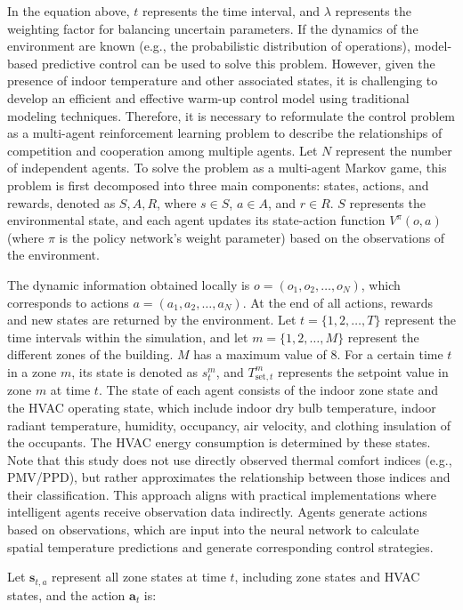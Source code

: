 \documentclass[preprint,12pt]{elsarticle}
\begin{document}
In the equation above, $t$ represents the time interval, and $\lambda$ represents the 
weighting factor for balancing uncertain parameters. If the dynamics of the environment are 
known (e.g., the probabilistic distribution of operations), model-based predictive control can be 
used to solve this problem. However, given the presence of indoor temperature and other associated states, 
it is challenging to develop an efficient and effective warm-up control model using traditional modeling techniques. 
Therefore, it is necessary to reformulate the control problem as a multi-agent reinforcement learning problem 
to describe the relationships of competition and cooperation among multiple agents. Let $N$ represent the 
number of independent agents. To solve the problem as a multi-agent Markov game, this problem is first decomposed 
into three main components: states, actions, and rewards, denoted as $S, A, R$, where $s \in S$, $a \in A$, 
and $r \in R$. $S$ represents the environmental state, and each agent updates its 
state-action function $V^\pi(o, a)$ (where $\pi$ is the policy network’s weight parameter) based 
on the observations of the environment.

The dynamic information obtained locally is $o = (o_1, o_2, \ldots, o_N)$, which corresponds to 
actions $a = (a_1, a_2, \ldots, a_N)$. At the end of all actions, rewards and new states are returned by the environment.
Let $t = \{1, 2, \ldots, T\}$ represent the time intervals within the simulation, 
and let $m = \{1, 2, \ldots, M\}$ represent the different zones of the building. $M$ has a 
maximum value of 8. For a certain time $t$ in a zone $m$, its state is denoted as $s_t^m$, 
and $T_{\text{set},t}^m$ represents the setpoint value in zone $m$ at time $t$. The state of 
each agent consists of the indoor zone state and the HVAC operating state, which include indoor dry bulb temperature, 
indoor radiant temperature, humidity, occupancy, air velocity, and clothing insulation of the occupants. 
The HVAC energy consumption is determined by these states. Note that this study does not use directly 
observed thermal comfort indices (e.g., PMV/PPD), but rather approximates the relationship between those 
indices and their classification. This approach aligns with practical implementations where intelligent agents 
receive observation data indirectly. Agents generate actions based on observations, which are input into the 
neural network to calculate spatial temperature predictions and generate corresponding control strategies.

Let $\mathbf{s}_{t,a}$ represent all zone states at time $t$, including zone 
states and HVAC states, and the action $\mathbf{a}_t$ is:
\end{document}
